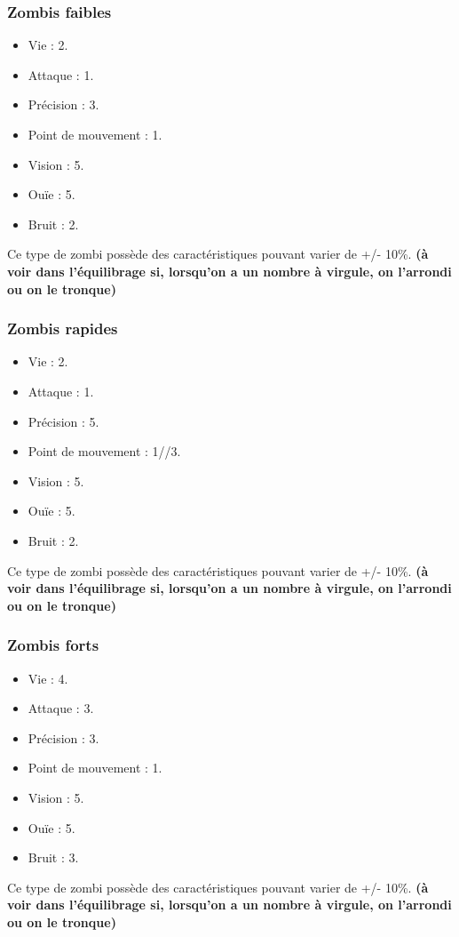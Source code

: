 \subsubsection{Zombis faibles}
\begin{itemize}
  \item Vie : 2.
  \item Attaque : 1.
  \item Précision : 3.
  \item Point de mouvement : 1.
  \item Vision : 5.
  \item Ouïe : 5.
  \item Bruit : 2.
\end{itemize}
Ce type de zombi possède des caractéristiques pouvant varier de +/- 10\%. \textbf{(à voir dans l'équilibrage si, lorsqu'on a un nombre à virgule, on l'arrondi ou on le tronque)}
\subsubsection{Zombis rapides}
\begin{itemize}
  \item Vie : 2.
  \item Attaque : 1.
  \item Précision : 5.
  \item Point de mouvement : 1//3.
  \item Vision : 5.
  \item Ouïe : 5.
  \item Bruit : 2.
\end{itemize}
Ce type de zombi possède des caractéristiques pouvant varier de +/- 10\%. \textbf{(à voir dans l'équilibrage si, lorsqu'on a un nombre à virgule, on l'arrondi ou on le tronque)}
\subsubsection{Zombis forts}
\begin{itemize}
  \item Vie : 4.
  \item Attaque : 3.
  \item Précision : 3.
  \item Point de mouvement : 1.
  \item Vision : 5.
  \item Ouïe : 5.
  \item Bruit : 3.
\end{itemize}
Ce type de zombi possède des caractéristiques pouvant varier de +/- 10\%. \textbf{(à voir dans l'équilibrage si, lorsqu'on a un nombre à virgule, on l'arrondi ou on le tronque)}
